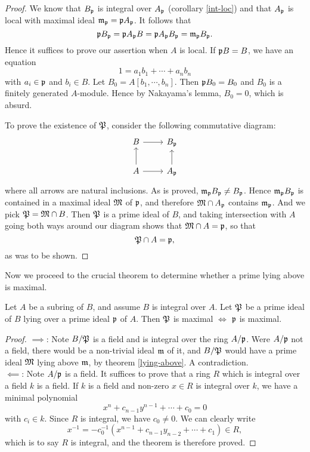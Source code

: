 			\begin{proof}
				We know that $B_\mathfrak{p}$ is integral over $A_\mathfrak{p}$ (corollary \ref{int-loc}) and that $A_\mathfrak{p}$ is local with maximal ideal $\mathfrak{m}_\mathfrak{p}=\mathfrak{p}A_\mathfrak{p}$. It follows that
				\[
					\mathfrak{p}B_\mathfrak{p}=\mathfrak{p}A_\mathfrak{p}B = \mathfrak{p}A_\mathfrak{p}B_\mathfrak{p}=\mathfrak{m}_\mathfrak{p}B_\mathfrak{p}.
				\]
				Hence it suffices to prove our assertion when $A$ is local. If $\mathfrak{p}B=B$, we have an equation
				\[
					1 = a_1b_1+\cdots+a_nb_n
				\]
				with $a_i \in \mathfrak{p}$ and $b_i \in B$. Let $B_0 = A[b_1,\cdots,b_n]$. Then $\mathfrak{p}B_0=B_0$ and $B_0$ is a finitely generated $A$-module. Hence by Nakayama's lemma, $B_0=0$, which is absurd.
				
				To prove the existence of $\mathfrak{P}$, consider the following commutative diagram:
				\[
					\begin{tikzcd}
						B \arrow[r]           & B_\mathfrak{p}           \\
						A \arrow[r] \arrow[u] & A_\mathfrak{p} \arrow[u]
					\end{tikzcd}
				\]
				where all arrows are natural inclusions. As is proved, $\mathfrak{m}_\mathfrak{p}B_\mathfrak{p} \ne B_\mathfrak{p}$. Hence $\mathfrak{m}_\mathfrak{p}B_\mathfrak{p}$ is contained in a maximal ideal $\mathfrak{M}$ of $\mathfrak{p}$, and therefore $\mathfrak{M} \cap A_\mathfrak{p}$ contains $\mathfrak{m}_\mathfrak{p}$. And we pick $\mathfrak{P}=\mathfrak{M} \cap B$. Then $\mathfrak{P}$ is a prime ideal of $B$, and taking intersection with $A$ going both ways around our diagram shows that $\mathfrak{M} \cap A = \mathfrak{p}$, so that
				\[
					\mathfrak{P} \cap A = \mathfrak{p},
				\]
				as was to be shown.
			\end{proof}
		
			Now we proceed to the crucial theorem to determine whether a prime lying above is maximal.
			
			\begin{theorem}\label{lie-above-maximal}
				Let $A$ be a subring of $B$, and assume $B$ is integral over $A$. Let $\mathfrak{P}$ be a prime ideal of $B$ lying over a prime ideal $\mathfrak{p}$ of $A$. Then $\mathfrak{P}$ is maximal $\iff$ $\mathfrak{p}$ is maximal.
			\end{theorem}
		
			\begin{proof}
				$\implies$: Note $B/\mathfrak{P}$ is a field and is integral over the ring $A/\mathfrak{p}$. Were $A/\mathfrak{p}$ not a field, there would be a non-trivial ideal $\mathfrak{m}$ of it, and $B/\mathfrak{P}$ would have a prime ideal $\mathfrak{M}$ lying above $\mathfrak{m}$, by theorem \ref{lying-above}. A contradiction. \\
				$\impliedby$: Note $A/\mathfrak{p}$ is a field. It suffices to prove that a ring $R$ which is integral over a field $k$ is a field. If $k$ is a field and non-zero $x \in R$ is integral over $k$, we have a minimal polynomial
				\[
					x^n+c_{n-1}y^{n-1}+\cdots+c_0=0
				\]
				with $c_i \in k$. Since $R$ is integral, we have $c_0 \ne 0$. We can clearly write
				\[
					x^{-1}=-c_0^{-1}(x^{n-1}+c_{n-1}y_{n-2}+\cdots+c_1) \in R,
				\]
				which is to say $R$ is integral, and the theorem is therefore proved.
			\end{proof}
			
